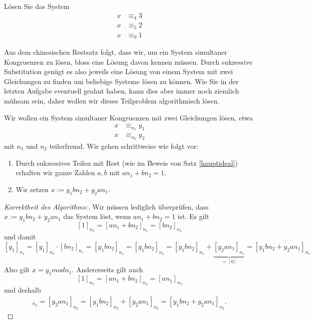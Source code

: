 \begin{ueb}
 Lösen Sie das System
\begin{align*}
  x&\equiv_{4} 3\\
x&\equiv_{5} 2\\
x&\equiv_{9} 1
\end{align*}

\end{ueb}

\begin{rk}
Aus dem chinesischen Restsatz folgt, dass wir, um ein System simultaner Kongruenzen zu lösen, bloss eine Lösung davon kennen müssen. Durch sukzessive Substitution genügt es also jeweils eine Lösung von einem System mit zwei Gleichungen zu finden um beliebige Systeme lösen zu können. Wie Sie in der letzten Aufgabe eventuell geahnt haben, kann dies aber immer noch ziemlich mühsam sein, daher wollen wir dieses Teilproblem algorithmisch lösen.
\end{rk}

\begin{alg}
Wir wollen ein System simultaner Kongruenzen mit zwei Gleichungen lösen, etwa
\begin{align*}
x&\equiv_{n_1} y_1\\
x&\equiv_{n_2} y_2
\end{align*}
mit $n_1$ und $n_2$ teilerfremd. Wir gehen schrittweise wie folgt vor:
 \begin{enumerate}
  \item Durch sukzessives Teilen mit Rest (wie im Beweis von Satz \ref{hauptideal}) erhalten wir ganze Zahlen $a,b$ mit $an_1+bn_2=1$.
\item Wir setzen $x:=y_1bn_2+y_2an_1$.
 \end{enumerate}
\end{alg}
\begin{proof}[Korrektheit des Algorithms:]
 Wir müssen lediglich überprüfen, dass $x:=y_1bn_2+y_2an_1$ das System löst, wenn $an_1+bn_2=1$ ist. Es gilt
\[
 [1]_{n_1}=[an_1+bn_2]_{n_1}=[bn_2]_{n_1}
\]
und damit
\[
 [y_1]_{n_1}=[y_1]_{n_1}\cdot[bn_2]_{n_1}=[y_1bn_2]_{n_1}=[y_1bn_2]_{n_1}=[y_1bn_2]_{n_1}+\underbrace{[y_2an_1]_{n_1}}_{=[0]}=[y_1bn_2+y_2an_1]_{n_1}
\]
Also gilt $x=y_1 mod n_1$. Andererseits gilt auch
\[
 [1]_{n_2}=[an_1+bn_2]_{n_2}=[an_1]_{n_2}
\]
und deshalb
\begin{align*}
 [y_2]_{n_2}=[y_2an_1]_{n_2}=[y_1bn_2]_{n_2}+[y_2an_1]_{n_2}=[y_1bn_2+y_2an_1]_{n_2}.
\end{align*}
\end{proof}


